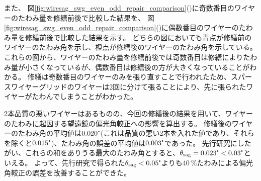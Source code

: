 \documentclass[../../main.tex]{subfiles}
\begin{document}
また、
図\ref{fig:wiresag_swg_even_odd_repair_comparison}()に奇数番目のワイヤーのたわみ量を修繕前後で比較した結果を、
図\ref{fig:wiresag_swg_even_odd_repair_comparison}()に偶数番目のワイヤーのたわみ量を修繕前後で比較した結果を示す。
どちらの図においても青点が修繕前のワイヤーのたわみ角を示し、橙点が修繕後のワイヤーのたわみ角を示している。
これらの図から、ワイヤーのたわみ量を修繕前後では奇数番目は修繕によりたわみ量が小さくなっているが、偶数番目は修繕後の方が大きくなっていることがわかる。
修繕は奇数番目のワイヤーのみを張り直すことで行われたため、スパースワイヤーグリッドのワイヤーは2回に分けて張ることにより、先に張られたワイヤーがたわんでしまうことがわかった。

2本品質の悪いワイヤーはあるものの、今回の修繕後の結果を用いて、ワイヤーのたわみに起因する望遠鏡の偏光角較正への影響を算出する。
修繕後のワイヤーのたわみ角の平均値は$0.020\tcdegree$(これは品質の悪い2本を入れた値であり、それらを除くと$0.015\tcdegree$)、たわみ角の誤差の平均値は$0.003\tcdegree$であった。
先行研究にしたがい、これらの和をありうる最大のたわみ角とすると、$\theta_{\mathrm{sag}}=0.023\tcdegree<0.03\tcdegree$といえる。
よって、先行研究で得られた$\theta_{\mathrm{sag}}<0.05\tcdegree$よりも$\SI{40}{\%}$たわみによる偏光角較正の誤差を改善することができた。
\end{document}

